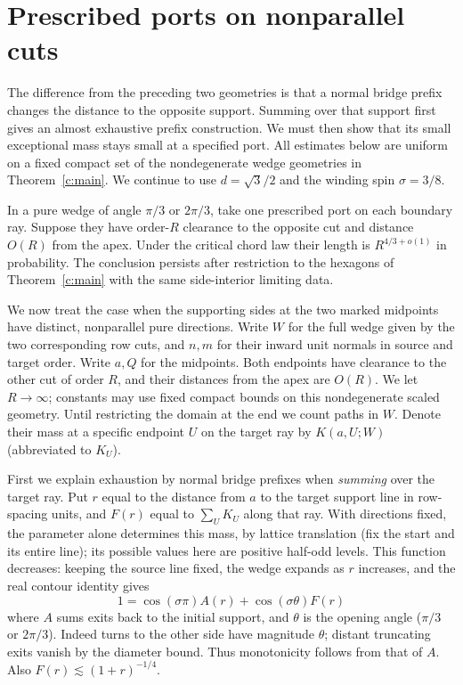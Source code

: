 \section{Prescribed ports on nonparallel cuts}\label{c:tilted}
The difference from the preceding two geometries is that a normal bridge
prefix changes the distance to the opposite support. Summing over that
support first gives an almost exhaustive prefix construction. We must
then show that its small exceptional mass stays small at a specified port.
All estimates below are uniform on a fixed compact set of the
nondegenerate wedge geometries in Theorem~\ref{c:main}. We continue to use
$d=\sqrt3/2$ and the winding spin $\sigma=3/8$.

\begin{theorem}\label{c:tilted-law}
In a pure wedge of angle $\pi/3$ or $2\pi/3$, take one prescribed port on each boundary ray. Suppose they have order-$R$ clearance to the opposite cut and distance $O(R)$
from the apex. Under the critical chord law their length is
$R^{4/3+o(1)}$ in probability. The conclusion persists after restriction
to the hexagons of Theorem~\ref{c:main} with the same side-interior
limiting data.
\end{theorem}
We now treat the case when the supporting sides at the two marked midpoints have distinct, nonparallel pure directions. Write \(W\) for the full wedge given by the two corresponding row cuts, and \(n,m\) for their inward unit normals in source and target order. Write \(a,Q\) for the midpoints. Both endpoints have clearance to the other cut of order \(R\), and their distances from the apex are \(O(R)\). We let \(R\to\infty\); constants may use fixed compact bounds on this nondegenerate scaled geometry. Until restricting the domain at the end we count paths in \(W\). Denote their mass at a specific endpoint \(U\) on the target ray by \(K(a,U;W)\) (abbreviated to \(K_U\)).



First we explain exhaustion by normal bridge prefixes when \emph{summing} over the target ray. Put \(r\) equal to the distance from \(a\) to the target support line in row-spacing units, and \(F(r)\) equal to \(\sum_U K_U\) along that ray. With directions fixed, the parameter alone determines this mass, by lattice translation (fix the start and its entire line); its possible values here are positive half-odd levels. This function decreases: keeping the source line fixed, the wedge expands as \(r\) increases, and the real contour identity gives
\[
 1=\cos(\sigma\pi) A(r)+\cos(\sigma\theta) F(r)
\]
where \(A\) sums exits back to the initial support, and \(\theta\) is the opening angle (\(\pi/3\) or \(2\pi/3\)). Indeed turns to the other side have magnitude \(\theta\); distant truncating exits vanish by the diameter bound. Thus monotonicity follows from that of \(A\). Also \(F(r)\lesssim(1+r)^{-1/4}\).



